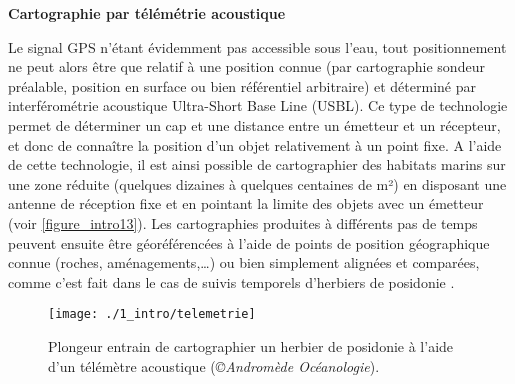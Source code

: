\noindent\textbf{Cartographie par télémétrie acoustique}

Le signal GPS n’étant évidemment pas accessible sous l’eau, tout positionnement ne peut alors être que relatif à une position connue (par cartographie sondeur préalable, position en surface ou bien référentiel arbitraire) et déterminé par interférométrie acoustique Ultra-Short Base Line (USBL). Ce type de technologie permet de déterminer un cap et une distance entre un émetteur et un récepteur, et donc de connaître la position d’un objet relativement à un point fixe. A l’aide de cette technologie, il est ainsi possible de cartographier des habitats marins sur une zone réduite (quelques dizaines à quelques centaines de m²) en disposant une antenne de réception fixe et en pointant la limite des objets avec un émetteur (voir \autoref{figure_intro13}). Les cartographies produites à différents pas de temps peuvent ensuite être géoréférencées à l’aide de points de position géographique connue (roches, aménagements,…) ou bien simplement alignées et comparées, comme c’est fait dans le cas de suivis temporels d’herbiers de posidonie \citep{descamp_underwater_2005, descamp_fast_2011}.

\begin{figure}[H]
	\begin{center}
	\texttt{[image: ./1\_intro/telemetrie]}
		\caption[Plongeur entrain de cartographier un herbier de posidonie à l’aide d’un télémètre acoustique]{Plongeur entrain de cartographier un herbier de posidonie à l’aide d’un télémètre acoustique (\textit{©Andromède Océanologie}).}
	\label{figure_intro13}
\end{center}
\end{figure}

\setlength{\fboxsep}{3pt}
\setlength{\fboxrule}{0.6pt}
\noindent{}

